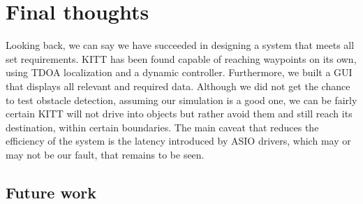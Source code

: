 \documentclass[11pt,titlepage]{report}
\begin{document}
\chapter{Final thoughts}
\label{ch:final-thoughts}
Looking back, we can say we have succeeded in designing a system that meets all set requirements. KITT has been found capable of reaching waypoints on its own, using TDOA localization and a dynamic controller. Furthermore, we built a GUI that displays all relevant and required data. Although we did not get the chance to test obstacle detection, assuming our simulation is a good one, we can be fairly certain KITT will not drive into objects but rather avoid them and still reach its destination, within certain boundaries. The main caveat that reduces the efficiency of the system is the latency introduced by ASIO drivers, which may or may not be our fault, that remains to be seen.

\section{Future work}
\end{document}
